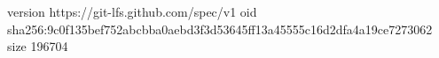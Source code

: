 version https://git-lfs.github.com/spec/v1
oid sha256:9c0f135bef752abcbba0aebd3f3d53645ff13a45555c16d2dfa4a19ce7273062
size 196704
